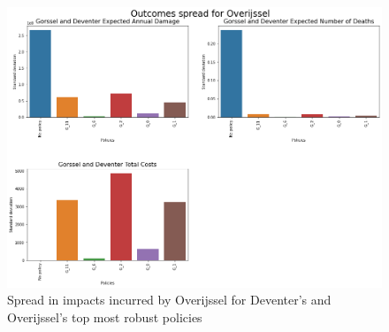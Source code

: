 \begin{figure}[h!]
    \centering
    \includegraphics[width=\textwidth]{report/figures/results/spreads/outcome_spreads_Overijssel.png}
    \caption{Spread in impacts incurred by Overijssel for Deventer's and Overijssel's top most robust policies}
    \label{fig:impacts_over}
\end{figure}